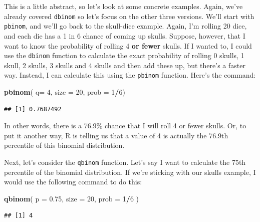 \documentclass[]{book}
\newenvironment{Shaded}{\begin{snugshade}}{\end{snugshade}}
\newcommand{\DataTypeTok}[1]{\textcolor[rgb]{0.13,0.29,0.53}{#1}}
\newcommand{\DecValTok}[1]{\textcolor[rgb]{0.00,0.00,0.81}{#1}}
\newcommand{\FloatTok}[1]{\textcolor[rgb]{0.00,0.00,0.81}{#1}}
\newcommand{\KeywordTok}[1]{\textcolor[rgb]{0.13,0.29,0.53}{\textbf{#1}}}
\newcommand{\NormalTok}[1]{#1}
\newcommand{\OperatorTok}[1]{\textcolor[rgb]{0.81,0.36,0.00}{\textbf{#1}}}
\begin{document}
This is a little abstract, so let's look at some concrete examples. Again, we've already covered \texttt{dbinom} so let's focus on the other three versions. We'll start with \texttt{pbinom}, and we'll go back to the skull-dice example. Again, I'm rolling 20 dice, and each die has a 1 in 6 chance of coming up skulls. Suppose, however, that I want to know the probability of rolling 4 \textbf{or fewer} skulls. If I wanted to, I could use the \texttt{dbinom} function to calculate the exact probability of rolling 0 skulls, 1 skull, 2 skulls, 3 skulls and 4 skulls and then add these up, but there's a faster way. Instead, I can calculate this using the \texttt{pbinom} function. Here's the command:

\begin{Shaded}
\begin{Highlighting}[]
\KeywordTok{pbinom}\NormalTok{( }\DataTypeTok{q=} \DecValTok{4}\NormalTok{, }\DataTypeTok{size =} \DecValTok{20}\NormalTok{, }\DataTypeTok{prob =} \DecValTok{1}\OperatorTok{/}\DecValTok{6}\NormalTok{)}
\end{Highlighting}
\end{Shaded}

\begin{verbatim}
## [1] 0.7687492
\end{verbatim}

In other words, there is a 76.9\% chance that I will roll 4 or fewer skulls. Or, to put it another way, R is telling us that a value of 4 is actually the 76.9th percentile of this binomial distribution.

Next, let's consider the \texttt{qbinom} function. Let's say I want to calculate the 75th percentile of the binomial distribution. If we're sticking with our skulls example, I would use the following command to do this:

\begin{Shaded}
\begin{Highlighting}[]
\KeywordTok{qbinom}\NormalTok{( }\DataTypeTok{p =} \FloatTok{0.75}\NormalTok{, }\DataTypeTok{size =} \DecValTok{20}\NormalTok{, }\DataTypeTok{prob =} \DecValTok{1}\OperatorTok{/}\DecValTok{6}\NormalTok{ )}
\end{Highlighting}
\end{Shaded}

\begin{verbatim}
## [1] 4
\end{verbatim}
\end{document}
